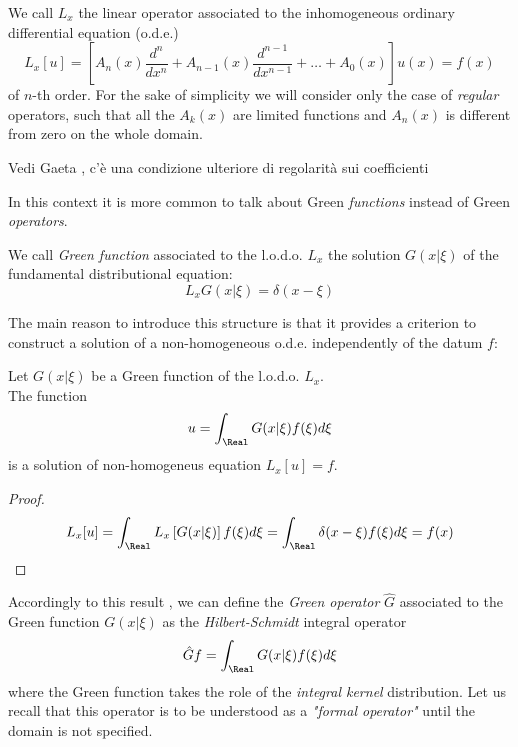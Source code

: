 \documentclass[Main]{subfiles}
\begin{document}
	We call $L_x$ the linear operator associated to the inhomogeneous ordinary differential equation (o.d.e.)
	\begin{displaymath}
		L_x [u] = \left[ A_n(x) \frac{d^n}{dx^n} + A_{n-1}(x) \frac{d^{n-1}}{dx^{n-1}} + \ldots + A_0(x) \right] u(x) = f(x)
	\end{displaymath}
	of $n$-th order.
	For the sake of simplicity we will consider only the case of \emph{regular} operators, such that all the $A_k(x)$ are limited functions and $A_n(x)$ is different from zero on the whole domain.
	\ifToninus \begin{Warning}
		Vedi Gaeta \cite{Gaeta2014}, c'è una condizione ulteriore di regolarità sui coefficienti
	\end{Warning} \fi
	
	In this context it is more common to talk about Green \textit{functions} instead of Green \textit{operators}.
	\begin{definition}
	We call \emph{Green function} associated to the l.o.d.o. $L_x$ the solution $G(x \vert \xi)$ of the fundamental distributional equation:
	\begin{equation}\label{Eq:FundamentalGreen}
		L_x G(x\vert\xi) = \delta(x-\xi)
	\end{equation}
	\end{definition}
	The main reason to introduce this structure is that it provides a criterion to construct a solution of a non-homogeneous o.d.e. independently of the datum $f$:
	\begin{proposition}
		Let $G(x \vert \xi)$ be a Green function of the l.o.d.o. $L_x$.\\
		The function
		\begin{displaymath}
			u = \int_\Real G( x \vert \xi) f(\xi) d\xi
		\end{displaymath}
		is a solution of non-homogeneus equation $L_x[u] = f$.
	\end{proposition}
	\begin{proof}
		\begin{displaymath}
			L_x[u] = \int_\Real L_x\left[ G(x \vert \xi ) \right] f(\xi) d\xi = \int_\Real \delta(x -\xi) f(\xi) d\xi = f(x)
		\end{displaymath}
	\end{proof}
	Accordingly to this result , we can define the \emph{Green operator} $\hat{G}$ associated to the Green function $G(x \vert \xi)$ as the \emph{Hilbert-Schmidt} integral operator 
			\begin{displaymath}
				\hat{G} f = \int_\Real G( x \vert \xi ) f(\xi) d\xi
			\end{displaymath}	
	where the Green function takes the role of the \emph{integral kernel} distribution.
	Let us recall that this operator is to be understood as a \emph{"formal operator"} until the domain is not specified.
	
\end{document}
